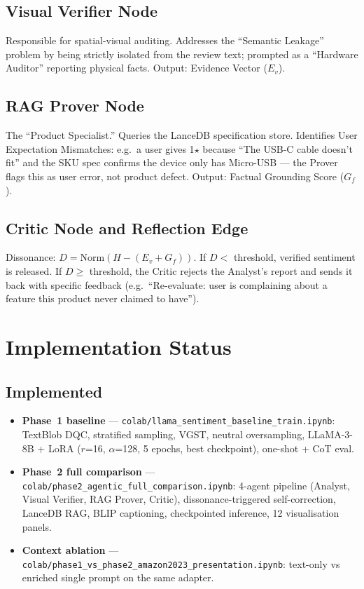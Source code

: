 \documentclass[12pt,a4paper]{article}
\begin{document}
\subsection{Visual Verifier Node}
Responsible for spatial-visual auditing. Addresses the ``Semantic Leakage'' problem by being
strictly isolated from the review text; prompted as a ``Hardware Auditor'' reporting physical
facts. Output: Evidence Vector ($E_v$).

\subsection{RAG Prover Node}
The ``Product Specialist.'' Queries the LanceDB specification store. Identifies User
Expectation Mismatches: e.g.\ a user gives 1$\star$ because ``The USB-C cable doesn't fit''
and the SKU spec confirms the device only has Micro-USB --- the Prover flags this as user
error, not product defect. Output: Factual Grounding Score ($G_f$).

\subsection{Critic Node and Reflection Edge}
Dissonance: $D = \mathrm{Norm}(H - (E_v + G_f))$. If $D <$ threshold, verified sentiment
is released. If $D \geq$ threshold, the Critic rejects the Analyst's report and sends it back
with specific feedback (e.g.\ ``Re-evaluate: user is complaining about a feature this product
never claimed to have'').

\section{Implementation Status}

\subsection{Implemented}

\begin{itemize}[leftmargin=*]
  \item \textbf{Phase~1 baseline} --- \texttt{colab/llama\_sentiment\_baseline\_train.ipynb}:
    TextBlob DQC, stratified sampling, VGST, neutral oversampling, LLaMA-3-8B + LoRA
    ($r$=16, $\alpha$=128, 5 epochs, best checkpoint), one-shot + CoT eval.

  \item \textbf{Phase~2 full comparison} --- \texttt{colab/phase2\_agentic\_full\_comparison.ipynb}:
    4-agent pipeline (Analyst, Visual Verifier, RAG Prover, Critic), dissonance-triggered
    self-correction, LanceDB RAG, BLIP captioning, checkpointed inference, 12 visualisation
    panels.

  \item \textbf{Context ablation} --- \texttt{colab/phase1\_vs\_phase2\_amazon2023\_presentation.ipynb}:
    text-only vs enriched single prompt on the same adapter.
\end{itemize}
\end{document}
